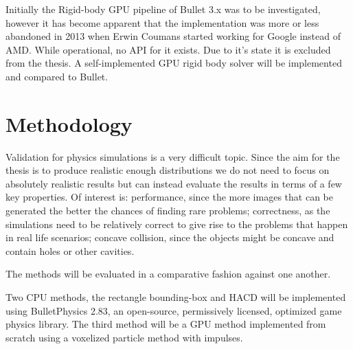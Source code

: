 Initially the Rigid-body GPU pipeline of Bullet 3.x was to be investigated, however
it has become apparent that the implementation was more or less abandoned in 2013
when Erwin Coumans started working for Google instead of AMD. While operational,
no API for it exists. Due to it's state it is excluded from the thesis.
A self-implemented GPU rigid body solver will be implemented and compared to Bullet.

\section{Methodology}
Validation for physics simulations is a very difficult topic. Since the aim for
the thesis is to produce realistic enough distributions we do not need to focus
on absolutely realistic results but can instead evaluate the results in terms of
a few key properties. Of interest is: performance, since the more images
that can be generated the better the chances of finding rare problems; correctness,
as the simulations need to be relatively correct to give rise to the problems that
 happen in real life scenarios; concave collision, since the objects might
 be concave and contain holes or other cavities.

The methods will be evaluated in a comparative fashion against one another.

Two CPU methods, the rectangle bounding-box and HACD will be implemented using
BulletPhysics 2.83, an open-source, permissively licensed, optimized game physics
library. The third method will be a GPU method implemented from scratch using a
voxelized particle method with impulses.
